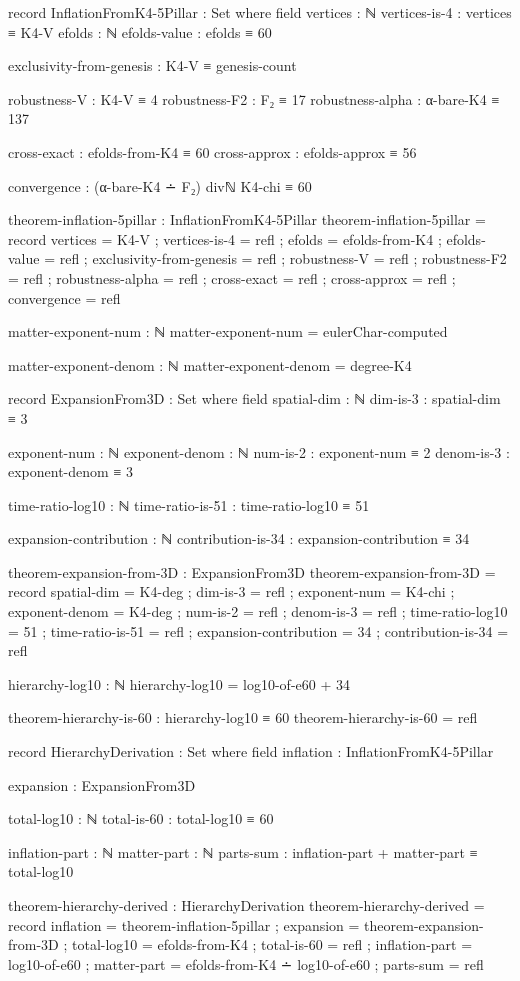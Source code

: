 \documentclass[11pt,a4paper]{book}
\begin{document}
\begin{code}
record InflationFromK4-5Pillar : Set where
  field
    vertices : ℕ
    vertices-is-4 : vertices ≡ K4-V
    efolds : ℕ
    efolds-value : efolds ≡ 60
    
    exclusivity-from-genesis : K4-V ≡ genesis-count
    
    robustness-V : K4-V ≡ 4
    robustness-F2 : F₂ ≡ 17
    robustness-alpha : α-bare-K4 ≡ 137
    
    cross-exact : efolds-from-K4 ≡ 60
    cross-approx : efolds-approx ≡ 56
    
    convergence : (α-bare-K4 ∸ F₂) divℕ K4-chi ≡ 60

theorem-inflation-5pillar : InflationFromK4-5Pillar
theorem-inflation-5pillar = record
  { vertices = K4-V
  ; vertices-is-4 = refl
  ; efolds = efolds-from-K4
  ; efolds-value = refl
  ; exclusivity-from-genesis = refl
  ; robustness-V = refl
  ; robustness-F2 = refl
  ; robustness-alpha = refl
  ; cross-exact = refl
  ; cross-approx = refl
  ; convergence = refl
  }

matter-exponent-num : ℕ
matter-exponent-num = eulerChar-computed

matter-exponent-denom : ℕ
matter-exponent-denom = degree-K4

record ExpansionFrom3D : Set where
  field
    spatial-dim : ℕ
    dim-is-3 : spatial-dim ≡ 3
    
    exponent-num : ℕ
    exponent-denom : ℕ
    num-is-2 : exponent-num ≡ 2
    denom-is-3 : exponent-denom ≡ 3
    
    time-ratio-log10 : ℕ
    time-ratio-is-51 : time-ratio-log10 ≡ 51
    
    expansion-contribution : ℕ
    contribution-is-34 : expansion-contribution ≡ 34

theorem-expansion-from-3D : ExpansionFrom3D
theorem-expansion-from-3D = record
  { spatial-dim = K4-deg
  ; dim-is-3 = refl
  ; exponent-num = K4-chi
  ; exponent-denom = K4-deg
  ; num-is-2 = refl
  ; denom-is-3 = refl
  ; time-ratio-log10 = 51
  ; time-ratio-is-51 = refl
  ; expansion-contribution = 34
  ; contribution-is-34 = refl
  }

hierarchy-log10 : ℕ
hierarchy-log10 = log10-of-e60 + 34

theorem-hierarchy-is-60 : hierarchy-log10 ≡ 60
theorem-hierarchy-is-60 = refl

record HierarchyDerivation : Set where
  field
    inflation : InflationFromK4-5Pillar
    
    expansion : ExpansionFrom3D
    
    total-log10 : ℕ
    total-is-60 : total-log10 ≡ 60
    
    inflation-part : ℕ
    matter-part : ℕ
    parts-sum : inflation-part + matter-part ≡ total-log10

theorem-hierarchy-derived : HierarchyDerivation
theorem-hierarchy-derived = record
  { inflation = theorem-inflation-5pillar
  ; expansion = theorem-expansion-from-3D
  ; total-log10 = efolds-from-K4
  ; total-is-60 = refl
  ; inflation-part = log10-of-e60
  ; matter-part = efolds-from-K4 ∸ log10-of-e60
  ; parts-sum = refl
  }
\end{code}
\end{document}
